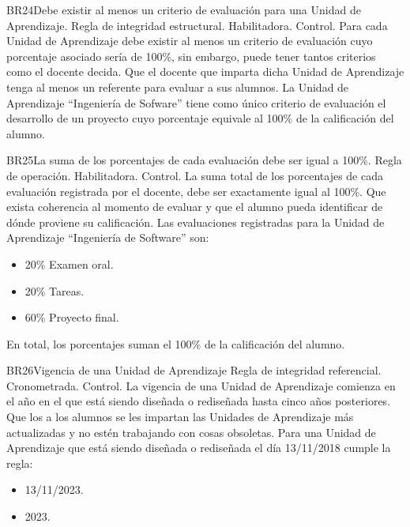 \begin{BussinesRule}{BR24}{Debe existir al menos un criterio de evaluación para una Unidad de Aprendizaje.}
    \BRitem[Tipo:] Regla de integridad estructural.
    \BRitem[Clase:] Habilitadora.
    \BRitem[Nivel:] Control.
    \BRitem[Descripción:] Para cada Unidad de Aprendizaje debe existir al menos un criterio de evaluación cuyo porcentaje asociado sería de 100\%, sin embargo, puede tener tantos criterios como el docente decida.
    \BRitem[Motivación:] Que el docente que imparta dicha Unidad de Aprendizaje tenga al menos un referente para evaluar a sus alumnos.
     La Unidad de Aprendizaje ``Ingeniería de Sofware'' tiene como único criterio de evaluación el desarrollo de un proyecto cuyo porcentaje equivale al 100\% de la calificación del alumno.
\end{BussinesRule}
\begin{BussinesRule}{BR25}{La suma de los porcentajes de cada evaluación debe ser igual a 100\%.}
    \BRitem[Tipo:] Regla de operación.
    \BRitem[Clase:] Habilitadora.
    \BRitem[Nivel:] Control.
    \BRitem[Descripción:] La suma total de los porcentajes de cada evaluación registrada por el docente, debe ser exactamente igual al 100\%.
    \BRitem[Motivación:] Que exista coherencia al momento de evaluar y que el alumno pueda identificar de dónde proviene su calificación.
     Las evaluaciones registradas para la Unidad de Aprendizaje ``Ingeniería de Software'' son:
        \begin{itemize}
            \item 20\% Examen oral.
            \item 20\% Tareas.
            \item 60\% Proyecto final.
        \end{itemize}
        En total, los porcentajes suman el 100\% de la calificación del alumno.
\end{BussinesRule}
\begin{BussinesRule}{BR26}{Vigencia de una Unidad de Aprendizaje}
    \BRitem[Tipo:] Regla de integridad referencial.
    \BRitem[Clase:] Cronometrada.
    \BRitem[Nivel:] Control.
    \BRitem[Descripción:] La vigencia de una Unidad de Aprendizaje comienza en el año en el que está siendo diseñada o rediseñada hasta cinco años posteriores.
    \BRitem[Motivación:] Que los a los alumnos se les impartan las Unidades de Aprendizaje más actualizadas y no estén trabajando con cosas obsoletas.
     Para una Unidad de Aprendizaje que está siendo diseñada o rediseñada el día 13/11/2018 cumple la regla:
        \begin{itemize}
            \item 13/11/2023.
            \item 2023.
        \end{itemize}
\end{BussinesRule}
